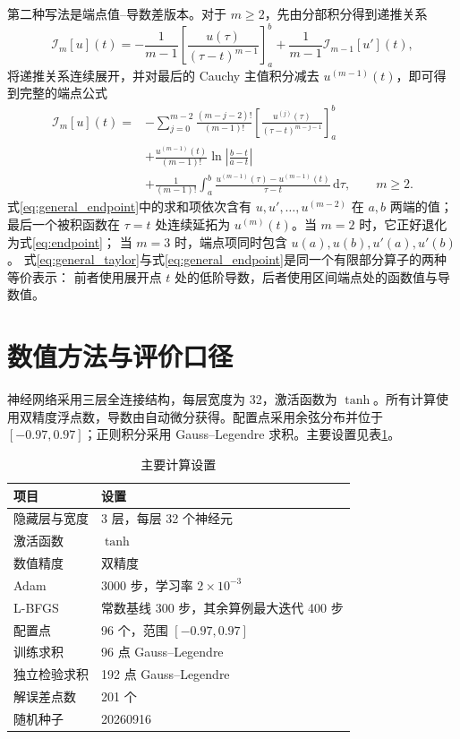 \documentclass[UTF8,fontset=none,11pt,a4paper]{ctexart}
\begin{document}
第二种写法是端点值--导数差版本。对于 $m\ge 2$，先由分部积分得到递推关系
\begin{equation}
\mathcal I_m[u](t)
=-\frac{1}{m-1}
\left[\frac{u(\tau)}{(\tau-t)^{m-1}}\right]_a^b
+\frac{1}{m-1}\mathcal I_{m-1}[u'](t),
\label{eq:general_endpoint_recurrence}
\end{equation}
将递推关系连续展开，并对最后的 Cauchy 主值积分减去 $u^{(m-1)}(t)$，即可得到完整的端点公式
\begin{align}
\mathcal I_m[u](t)={}&
-\sum_{j=0}^{m-2}\frac{(m-j-2)!}{(m-1)!}
\left[
\frac{u^{(j)}(\tau)}{(\tau-t)^{m-j-1}}
\right]_a^b
\nonumber\\
&+\frac{u^{(m-1)}(t)}{(m-1)!}
\ln\left|\frac{b-t}{a-t}\right|
\nonumber\\
&+\frac{1}{(m-1)!}\int_a^b
\frac{u^{(m-1)}(\tau)-u^{(m-1)}(t)}{\tau-t}\,\mathrm d\tau,
\qquad m\ge 2.
\label{eq:general_endpoint}
\end{align}
式\eqref{eq:general_endpoint}中的求和项依次含有
$u,u',\ldots,u^{(m-2)}$ 在 $a,b$ 两端的值；最后一个被积函数在
$\tau=t$ 处连续延拓为 $u^{(m)}(t)$。当 $m=2$ 时，它正好退化为式\eqref{eq:endpoint}；
当 $m=3$ 时，端点项同时包含 $u(a),u(b),u'(a),u'(b)$。
式\eqref{eq:general_taylor}与式\eqref{eq:general_endpoint}是同一个有限部分算子的两种等价表示：
前者使用展开点 $t$ 处的低阶导数，后者使用区间端点处的函数值与导数值。

\section{数值方法与评价口径}

神经网络采用三层全连接结构，每层宽度为 32，激活函数为 $\tanh$。所有计算使用双精度浮点数，导数由自动微分获得。配置点采用余弦分布并位于 $[-0.97,0.97]$；正则积分采用 Gauss--Legendre 求积。主要设置见表\ref{tab:config}。

\begin{table}[H]
\centering
\caption{主要计算设置}
\label{tab:config}
\begin{tabular}{ll}
\toprule
项目 & 设置\\
\midrule
隐藏层与宽度 & 3 层，每层 32 个神经元\\
激活函数 & $\tanh$\\
数值精度 & 双精度\\
Adam & 3000 步，学习率 $2\times10^{-3}$\\
L-BFGS & 常数基线 300 步，其余算例最大迭代 400 步\\
配置点 & 96 个，范围 $[-0.97,0.97]$\\
训练求积 & 96 点 Gauss--Legendre\\
独立检验求积 & 192 点 Gauss--Legendre\\
解误差点数 & 201 个\\
随机种子 & 20260916\\
\bottomrule
\end{tabular}
\end{table}
\end{document}
